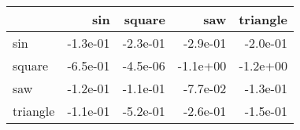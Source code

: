 \begin{tabular}{lrrrr}
\toprule
{} &      sin &   square &      saw &  triangle \\
\midrule
sin      & -1.3e-01 & -2.3e-01 & -2.9e-01 &  -2.0e-01 \\
square   & -6.5e-01 & -4.5e-06 & -1.1e+00 &  -1.2e+00 \\
saw      & -1.2e-01 & -1.1e-01 & -7.7e-02 &  -1.3e-01 \\
triangle & -1.1e-01 & -5.2e-01 & -2.6e-01 &  -1.5e-01 \\
\bottomrule
\end{tabular}
